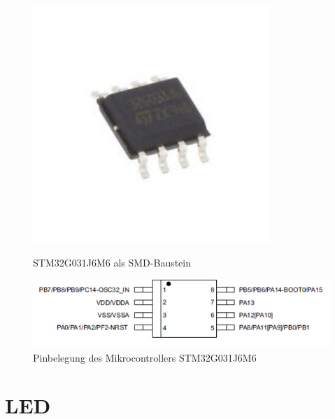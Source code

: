 \documentclass[a4paper,
DIV=13,
12pt,
BCOR=10mm,
department=FakEI,
parskip=half,
automark,
]{article}
\begin{document}
\begin{figure}[!hbpt]
 \begin{center} \includegraphics[width=0.8\textwidth]{s-l225.jpg}
 \caption{STM32G031J6M6 als SMD-Baustein}
 \label{fig:SMD-Baustein}
  \end{center}
   \begin{center} \includegraphics[width=1\textwidth]{Stm32g031j6m6.png}
 \caption{Pinbelegung des Mikrocontrollers STM32G031J6M6}
 \label{fig:SMD-Baustein}
  \end{center}  
\end{figure}
\newpage
\section{LED}
\end{document}
